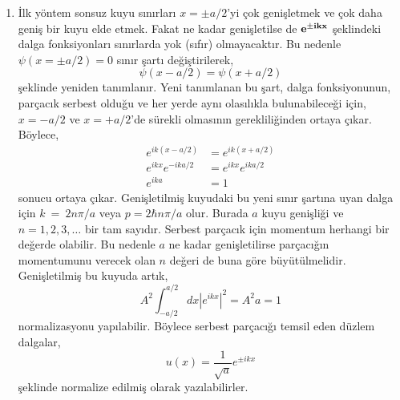 \documentclass[a4paper,12pt, twoside]{article}
\begin{document}
\begin{enumerate}
	\item İlk yöntem sonsuz kuyu sınırları $x=\pm a/2$'yi çok genişletmek ve çok daha geniş bir kuyu elde etmek. Fakat ne kadar genişletilse de $\bf e ^ { \pm i k x }$ şeklindeki dalga fonksiyonları sınırlarda yok (sıfır) olmayacaktır. Bu nedenle $\psi (x=\pm a / 2 ) = 0$ sınır şartı değiştirilerek,
	\begin{equation}
	\psi ( x-a/2) = \psi ( x + a/2 )
	\end{equation}
	şeklinde yeniden tanımlanır. Yeni tanımlanan bu şart, dalga fonksiyonunun, parçacık serbest olduğu ve her yerde aynı olasılıkla bulunabileceği için, $x=-a/2$ ve $x=+a/2$'de sürekli olmasının gerekliliğinden ortaya çıkar. Böylece,
	\begin{align*}
	e ^ { i k (x-a/2) } &= e ^ { i k (x+a/2) }\\
	e ^ { i k x}	e ^ { -i k a/2}  &= e ^ { i k x } 	e ^ { i k a/2} \\
	e ^ { i k a} &= 1
	\end{align*}
	sonucu ortaya çıkar. Genişletilmiş kuyudaki bu yeni sınır şartına uyan dalga için $k~=~2 n \pi / a$ veya $p = 2 \hbar n \pi / a$ olur. Burada $a$ kuyu genişliği ve $n=1,2,3, \ldots$ bir tam sayıdır. Serbest parçacık için momentum herhangi bir değerde olabilir. Bu nedenle $a$ ne kadar genişletilirse parçacığın momentumunu verecek olan $n$ değeri de buna göre büyütülmelidir. Genişletilmiş bu kuyuda artık,
	\begin{equation}
	A ^ { 2 } \int _ { -a/2 } ^ { a/2 } d x \left| e ^ { i k x } \right| ^ { 2 } = A ^ { 2 } a = 1
	\end{equation}
	normalizasyonu yapılabilir. Böylece serbest parçacığı temsil eden düzlem dalgalar,
	\begin{equation}
	u(x) = \frac{1}{\sqrt{a}} e ^ { \pm i k x }
	\end{equation}
	şeklinde normalize edilmiş olarak yazılabilirler.
	

\end{enumerate}
\end{document}
